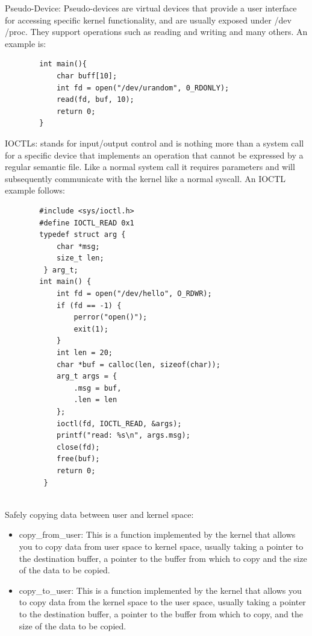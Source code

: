     Pseudo-Device: Pseudo-devices are virtual devices that provide a user interface for accessing specific kernel functionality, and are usually exposed under /dev /proc.\newline
    They support operations such as reading and writing and many others.
    An example is:
    \begin{verbatim}
        int main(){
            char buff[10];
            int fd = open("/dev/urandom", 0_RDONLY);
            read(fd, buf, 10);
            return 0;
        }
    \end{verbatim}
    IOCTLs: stands for input/output control and is nothing more than a system call for a specific device that implements an operation that cannot be expressed by a regular semantic file.\newline
    Like a normal system call it requires parameters and will subsequently communicate with the kernel like a normal syscall.\newline
    An IOCTL example follows: 
    \clearpage
    \begin{verbatim}
        #include <sys/ioctl.h> 
        #define IOCTL_READ 0x1 
        typedef struct arg { 
            char *msg; 
            size_t len;
         } arg_t; 
        int main() { 
            int fd = open("/dev/hello", O_RDWR); 
            if (fd == -1) { 
                perror("open()"); 
                exit(1); 
            } 
            int len = 20; 
            char *buf = calloc(len, sizeof(char)); 
            arg_t args = { 
                .msg = buf, 
                .len = len 
            }; 
            ioctl(fd, IOCTL_READ, &args); 
            printf("read: %s\n", args.msg); 
            close(fd); 
            free(buf); 
            return 0; 
         }
    
    \end{verbatim}
    \clearpage
    Safely copying data between user and kernel space: 
    \begin{itemize}
        \item copy\_from\_user: This is a function implemented by the kernel that allows you to copy data from user space to kernel space, usually taking a pointer to the destination buffer, a pointer to the buffer from which to copy and the size of the data to be copied.\newline
        \item copy\_to\_user: This is a function implemented by the kernel that allows you to copy data from the kernel space to the user space, usually taking a pointer to the destination buffer, a pointer to the buffer from which to copy, and the size of the data to be copied.\newline
    \end{itemize}
